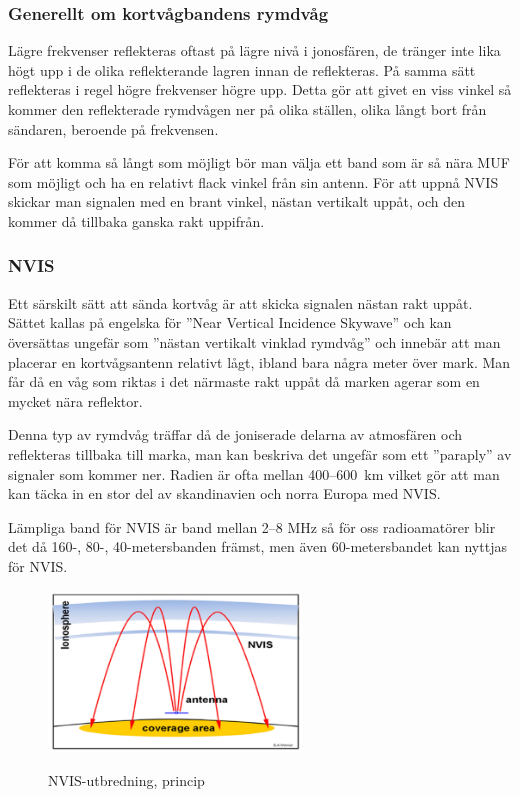 \subsubsection{Generellt om kortvågbandens rymdvåg}

Lägre frekvenser reflekteras oftast på lägre nivå i jonosfären, de tränger inte lika högt upp i de olika reflekterande lagren innan de reflekteras. På samma sätt reflekteras i regel högre frekvenser högre upp. Detta gör att givet en viss vinkel så kommer den reflekterade rymdvågen ner på olika ställen, olika långt bort från sändaren, beroende på frekvensen. 

För att komma så långt som möjligt bör man välja ett band som är så nära MUF som möjligt och ha en relativt flack vinkel från sin antenn. För att uppnå NVIS skickar man signalen med en brant vinkel, nästan vertikalt uppåt, och den kommer då tillbaka ganska rakt uppifrån.

\subsubsection{NVIS}

Ett särskilt sätt att sända kortvåg är att skicka signalen nästan rakt uppåt. Sättet kallas på engelska för ''Near Vertical Incidence Skywave'' och kan översättas ungefär som ''nästan vertikalt vinklad rymdvåg'' och innebär att man placerar en kortvågsantenn relativt lågt, ibland bara några meter över mark. Man får då en våg som riktas i det närmaste rakt uppåt då marken agerar som en mycket nära reflektor.

Denna typ av rymdvåg träffar då de joniserade delarna av atmosfären och reflekteras tillbaka till marka, man kan beskriva det ungefär som ett ''paraply'' av signaler som kommer ner. Radien är ofta mellan 400--600~km vilket gör att man kan täcka in en stor del av skandinavien och norra Europa med NVIS.

Lämpliga band för NVIS är band mellan 2--8 MHz så för oss radioamatörer blir det då 160-, 80-, 40-metersbanden främst, men även 60-metersbandet kan nyttjas för NVIS.

\begin{figure}[h]
	\centering
	\includegraphics[width=0.6\textwidth]{bilder/NVIS-Propagation}
	\label{fig:nvis-propagation}
	\caption{NVIS-utbredning, princip}
\end{figure}

